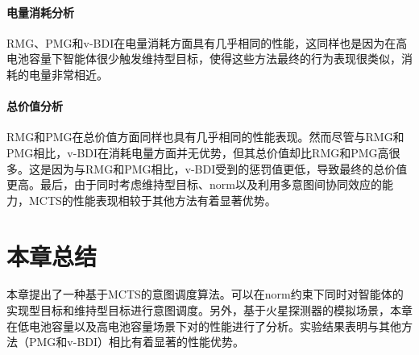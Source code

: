 \paragraph{电量消耗分析}
RMG、PMG和v-BDI在电量消耗方面具有几乎相同的性能，这同样也是因为在高电池容量下智能体很少触发维持型目标，使得这些方法最终的行为表现很类似，消耗的电量非常相近。
\paragraph{总价值分析}
RMG和PMG在总价值方面同样也具有几乎相同的性能表现。然而尽管与RMG和PMG相比，v-BDI在消耗电量方面并无优势，但其总价值却比RMG和PMG高很多。这是因为与RMG和PMG相比，v-BDI受到的惩罚值更低，导致最终的总价值更高。最后，由于同时考虑维持型目标、norm以及利用多意图间协同效应的能力，MCTS的性能表现相较于其他方法有着显著优势。

\section{本章总结}
本章提出了一种基于MCTS的意图调度算法\SAT 。\SAT 可以在norm约束下同时对智能体的实现型目标和维持型目标进行意图调度。另外，基于火星探测器的模拟场景，本章在低电池容量以及高电池容量场景下对\SAT 的性能进行了分析。实验结果表明\SAT 与其他方法（PMG和v-BDI）相比有着显著的性能优势。
